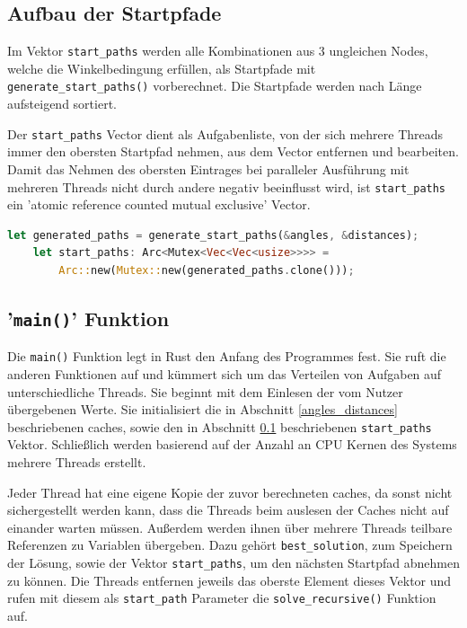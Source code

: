 \documentclass[a4paper,10pt,ngerman]{scrartcl}
\begin{document}
\subsection{Aufbau der Startpfade} \label{startpfade}
Im Vektor \lstinline{start_paths} werden alle Kombinationen aus 3 ungleichen Nodes, welche die Winkelbedingung erfüllen, als Startpfade mit \lstinline{generate_start_paths()} vorberechnet.
Die Startpfade werden nach Länge aufsteigend sortiert. 

Der \lstinline{start_paths} Vector dient als Aufgabenliste, von der sich mehrere Threads immer den obersten Startpfad nehmen, aus dem Vector entfernen und bearbeiten.
Damit das Nehmen des obersten Eintrages bei paralleler Ausführung mit mehreren Threads nicht durch andere negativ beeinflusst wird, ist \lstinline{start_paths} ein ’atomic reference counted mutual exclusive’ Vector. 
\lstset{style=boxed}
\begin{lstlisting}[language=Rust]
    let generated_paths = generate_start_paths(&angles, &distances);
    let start_paths: Arc<Mutex<Vec<Vec<usize>>>> = 
    	Arc::new(Mutex::new(generated_paths.clone()));
\end{lstlisting}
\lstset{style=reference}

\subsection{'\lstinline{main()}' Funktion}
Die \lstinline{main()} Funktion legt in Rust den Anfang des Programmes fest. Sie ruft die anderen Funktionen auf und kümmert sich um das Verteilen von Aufgaben auf unterschiedliche Threads. Sie beginnt mit dem Einlesen der vom Nutzer übergebenen Werte. Sie initialisiert die in Abschnitt \ref{angles_distances} beschriebenen caches, sowie den in Abschnitt \ref{startpfade} beschriebenen \lstinline{start_paths} Vektor. Schließlich werden basierend auf der Anzahl an CPU Kernen des Systems mehrere Threads erstellt. 

Jeder Thread hat eine eigene Kopie der zuvor berechneten caches, da sonst nicht sichergestellt werden kann, dass die Threads beim auslesen der Caches nicht auf einander warten müssen. Außerdem werden ihnen über mehrere Threads teilbare Referenzen zu Variablen übergeben. Dazu gehört \lstinline{best_solution}, zum Speichern der Lösung, sowie der Vektor \lstinline{start_paths}, um den nächsten Startpfad abnehmen zu können. Die Threads entfernen jeweils das oberste Element dieses Vektor und rufen mit diesem als \lstinline{start_path} Parameter die \lstinline{solve_recursive()} Funktion auf. 
\end{document}
